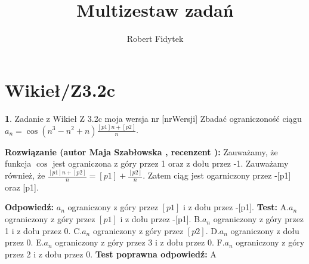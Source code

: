 \documentclass[12pt, a4paper]{article}
\title{Multizestaw zadań}
\author{Robert Fidytek}
\date{}
\theoremstyle{definition} %
\newtheorem{zad}{}
\newcommand{\kategoria}[1]{\section{#1}} %
\newcommand{\zadStart}[1]{\begin{zad}#1\newline} %
\newcommand{\zadStop}{\end{zad}}   %
\newcommand{\rozwStart}[2]{\noindent \textbf{Rozwiązanie (autor #1 , recenzent #2): }\newline} %
\newcommand{\rozwStop}{\newline}                                            %
\newcommand{\odpStart}{\noindent \textbf{Odpowiedź:}\newline}    %
\newcommand{\odpStop}{\newline}                                             %
\newcommand{\testStart}{\noindent \textbf{Test:}\newline} %
\newcommand{\testStop}{\newline} %
\newcommand{\kluczStart}{\noindent \textbf{Test poprawna odpowiedź:}\newline} %
\newcommand{\kluczStop}{\newline} %
\begin{document}
\maketitle


\kategoria{Wikieł/Z3.2c}
\zadStart{Zadanie z Wikieł Z 3.2c moja wersja nr [nrWersji]}
Zbadać ograniczoność ciągu $a_{n}=\cos(n^{3}-n^{2}+n)\frac{[p1]n+[p2]}{n}$.
\zadStop

\rozwStart{Maja Szabłowska}{}
Zauważamy, że funkcja $\cos$ jest ograniczona z góry przez 1 oraz z dołu przez -1. 
Zauważamy również, że $\frac{[p1]n+[p2]}{n}=[p1]+\frac{[p2]}{n}.$ Zatem ciąg jest ogarniczony przez -[p1] oraz [p1].
\rozwStop


\odpStart
$a_{n}$ ograniczony z góry przez $[p1]$ i z dołu przez -[p1].
\odpStop
\testStart
A.$a_{n}$ ograniczony z góry przez $[p1]$ i z dołu przez -[p1].
B.$a_{n}$ ograniczony z góry przez 1 i z dołu przez 0.
C.$a_{n}$ ograniczony z góry przez $[p2]$.
D.$a_{n}$ ograniczony z dołu przez 0.
E.$a_{n}$ ograniczony z góry przez 3 i z dołu przez 0.
F.$a_{n}$ ograniczony z góry przez 2 i z dołu przez 0.
\testStop
\kluczStart
A
\kluczStop
\end{document}

